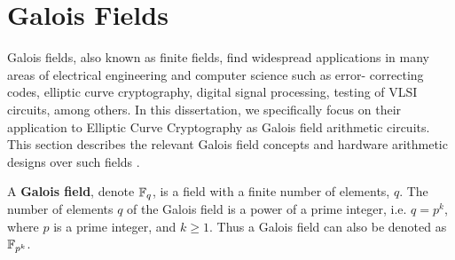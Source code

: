 \section{Galois Fields}\label{sec:ff}
Galois fields, also known as finite fields, find widespread applications in 
many areas of electrical engineering and computer science such as error-
correcting codes, elliptic curve cryptography, digital signal processing, 
testing of VLSI circuits, among others.
In this dissertation, we specifically focus on their application to 
Elliptic Curve Cryptography as Galois field arithmetic circuits.
This section describes the relevant Galois field concepts
\cite{galois_field:mceliece} \cite{ftheory:2006} \cite{ff:1997}
and hardware arithmetic designs over such fields \cite{mastro:1989} \cite{PT:1985} 
\cite{acar:1998} \cite{wu:2002} \cite{Knezevic:2008}. 


\begin{Definition} 
A {\bf Galois field}, denote ${\mathbb{F}}_{q}$, is a field with a finite
number of elements, $q$. The number of elements $q$ of the Galois field is
a power of a prime integer, i.e. $q = p^k$, where $p$ is a prime
integer, and $k \geq 1$. Thus a Galois field can also be denoted as 
${\mathbb{F}}_{p^{k}}$.
\end{Definition}


